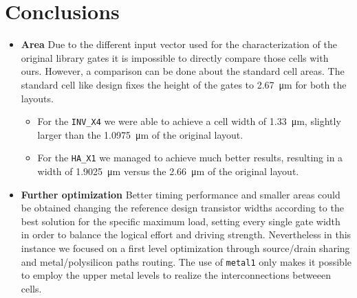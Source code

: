 \documentclass[a4paper]{article}
\newcommand{\inv}{\texttt{INV\_X4}\xspace}
\newcommand{\ha}{\texttt{HA\_X1}\xspace}
\begin{document}
\section{Conclusions}
\begin{itemize}
	\item \textbf{Area} Due to the different input vector used for the characterization of the original library gates it is impossible to directly compare those cells with ours. However, a comparison can be done about the standard cell areas. The standard cell like design fixes the height of the gates to \SI{2.67}{\micro\meter} for both the layouts.
	\begin{itemize}
		\item For the \inv we were able to achieve a cell width of \SI{1.33}{\micro\meter}, slightly larger than the \SI{1.0975}{\micro\meter} of the original layout.

		\item For the \ha we managed to achieve much better results, resulting in a width of \SI{1.9025}{\micro\meter} versus the \SI{2.66}{\micro\meter} of the original layout.
	\end{itemize}

	\item \textbf{Further optimization} Better timing performance and smaller areas could be obtained changing the reference design transistor widths according to the best solution for the specific maximum load, setting every single gate width in order to balance the logical effort and driving strength. Nevertheless in this instance we focused on a first level optimization through source/drain sharing and metal/polysilicon paths routing. The use of \texttt{metal1} only makes it possible to employ the upper metal levels to realize the interconnections betweeen cells.
\end{itemize}
\end{document}
